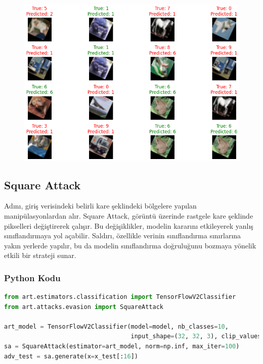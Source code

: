 \begin{figure}[h]
    \centering
    \includegraphics[width=1\textwidth]{images/spatial_transformation_results.png}
    \caption{}
\end{figure}

\newpage

\subsection{Square Attack}

Adını, giriş verisindeki belirli kare şeklindeki bölgelere yapılan manipülasyonlardan alır. Square Attack, görüntü üzerinde rastgele kare şeklinde pikselleri değiştirerek çalışır. Bu değişiklikler, modelin kararını etkileyerek yanlış sınıflandırmaya yol açabilir. Saldırı, özellikle verinin sınıflandırma sınırlarına yakın yerlerde yapılır, bu da modelin sınıflandırma doğruluğunu bozmaya yönelik etkili bir strateji sunar.

\subsubsection{Python Kodu}

\begin{lstlisting}[language=Python]
from art.estimators.classification import TensorFlowV2Classifier
from art.attacks.evasion import SquareAttack

art_model = TensorFlowV2Classifier(model=model, nb_classes=10, 
                                   input_shape=(32, 32, 3), clip_values=(0, 1))
sa = SquareAttack(estimator=art_model, norm=np.inf, max_iter=100)
adv_test = sa.generate(x=x_test[:16])
\end{lstlisting}

